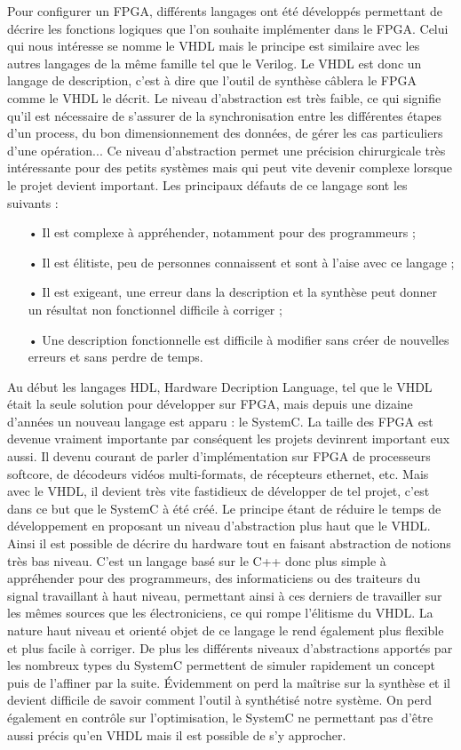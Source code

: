 \documentclass[a4paper,12pt]{article}
\begin{document}
    Pour configurer un FPGA, différents langages ont été développés permettant de décrire les fonctions logiques que l'on souhaite implémenter dans le FPGA. Celui qui nous intéresse se nomme le VHDL mais le principe est similaire avec les autres langages de la même famille tel que le Verilog. Le VHDL est donc un langage de description, c'est à dire que l'outil de synthèse câblera le FPGA comme le VHDL le décrit. Le niveau d'abstraction est très faible, ce qui signifie qu'il est nécessaire de s'assurer de la synchronisation entre les différentes étapes d'un process, du bon dimensionnement des données, de gérer les cas particuliers d'une opération... Ce niveau d'abstraction permet une précision chirurgicale très intéressante pour des petits systèmes mais qui peut vite devenir complexe lorsque le projet devient important. Les principaux défauts de ce langage sont les suivants :
    \begin{itemize}
    \item[•] Il est complexe à appréhender, notamment pour des programmeurs ;
    \item[•] Il est élitiste, peu de personnes connaissent et sont à l'aise avec ce langage ;
    \item[•] Il est exigeant, une erreur dans la description et la synthèse peut donner un résultat non fonctionnel difficile à corriger ;
    \item[•] Une description fonctionnelle est difficile à modifier sans créer de nouvelles erreurs et sans perdre de temps.
    \end{itemize}
    
    Au début les langages HDL, Hardware Decription Language, tel que le VHDL était la seule solution pour développer sur FPGA, mais depuis une dizaine d'années un nouveau langage est apparu : le SystemC. La taille des FPGA est devenue vraiment importante par conséquent les projets devinrent important eux aussi. Il devenu courant de parler d'implémentation sur FPGA de processeurs softcore, de décodeurs vidéos multi-formats, de récepteurs ethernet, etc. Mais avec le VHDL, il devient très vite fastidieux de développer de tel projet, c'est dans ce but que le SystemC à été créé. Le principe étant de réduire le temps de développement en proposant un niveau d'abstraction plus haut que le VHDL. Ainsi il est possible de décrire du hardware tout en faisant abstraction de notions très bas niveau. C'est un langage basé sur le C++ donc plus simple à appréhender pour des programmeurs, des informaticiens ou des traiteurs du signal travaillant à haut niveau, permettant ainsi à ces derniers de travailler sur les mêmes sources que les électroniciens, ce qui rompe l'élitisme du VHDL. La nature haut niveau et orienté objet de ce langage le rend également plus flexible et plus facile à corriger. De plus les différents niveaux d'abstractions apportés par les nombreux types du SystemC permettent de simuler rapidement un concept puis de l'affiner par la suite. Évidemment on perd la maîtrise sur la synthèse et il devient difficile de savoir comment l'outil à synthétisé notre système. On perd également en contrôle sur l'optimisation, le SystemC ne permettant pas d'être aussi précis qu'en VHDL mais il est possible de s'y approcher. 
\end{document}
